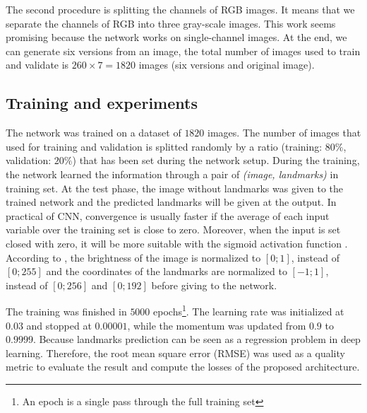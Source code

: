 \documentclass[10pt]{article}
\begin{document}
The second procedure is splitting the channels of RGB
images. It means that we separate the channels of RGB into
three gray-scale images. This work seems promising because
the network works on single-channel images. At the end, we
can generate six versions from an image, the total number of
images used to train and validate is $260 \times 7 = 1820$ images
(six versions and original image).

\subsection{Training and experiments}
\label{straining}
The network was trained on a dataset of $1820$ images. The number of images that
used for training and validation is splitted randomly by a ratio
(training: $80\%$, validation: $20\%$) that has been set during the
network setup. During the training, the network learned the information through a pair of \textit{(image, landmarks)} in training set. At the test phase, the image without landmarks was given to the trained network and the predicted landmarks will be given at the output. In practical of CNN, convergence is
usually faster if the average of each input variable over the
training set is close to zero. Moreover, when the input is set
closed with zero, it will be more suitable with the sigmoid
activation function \cite{lecun2012efficient}. According to \cite{lecun2012efficient}, the brightness of
the image is normalized to $[0; 1]$, instead of $[0; 255]$ and the
coordinates of the landmarks are normalized to $[-1; 1]$, instead
of $[0; 256]$ and $[0; 192]$ before giving to the network.

The training was finished in $5000$ epochs\footnote{An epoch is a single pass through the full training set}. The learning rate was initialized at $0.03$ and stopped at $0.00001$, while the momentum was updated from $0.9$ to $0.9999$. 
Because landmarks prediction can be seen as a regression problem in deep learning. Therefore, the root mean square error (RMSE) was used as a quality metric to evaluate the result and compute the losses of the proposed architecture.
\end{document}
